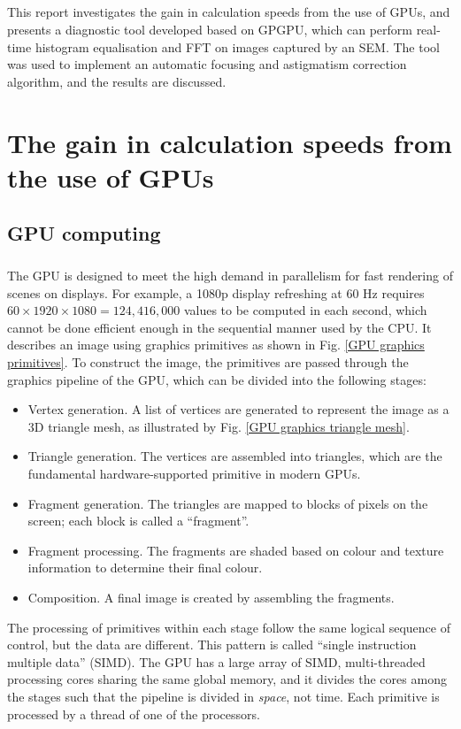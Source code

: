 \documentclass[12pt, twocolumn]{report}
\begin{document}
\paragraph{}
This report investigates the gain in calculation speeds from the use of GPUs, and presents a diagnostic tool developed based on GPGPU, which can perform real-time histogram equalisation and FFT on images captured by an SEM. The tool was used to implement an automatic focusing and astigmatism correction algorithm, and the results are discussed.

\chapter{The gain in calculation speeds from the use of GPUs}
\section{GPU computing}
\paragraph{}
The GPU is designed to meet the high demand in parallelism for fast rendering of scenes on displays. For example, a 1080p display refreshing at 60 Hz requires $60 \times 1920 \times 1080 = 124,416,000$ values to be computed in each second, which cannot be done efficient enough in the sequential manner used by the CPU. It describes an image using graphics primitives as shown in Fig. \ref{GPU graphics primitives}. To construct the image, the primitives are passed through the graphics pipeline of the GPU, which can be divided into the following stages:
\begin{itemize}
    \item Vertex generation. A list of vertices are generated to represent the image as a 3D triangle mesh, as illustrated by Fig. \ref{GPU graphics triangle mesh}.
    \item Triangle generation. The vertices are assembled into triangles, which are the fundamental hardware-supported primitive in modern GPUs.
    \item Fragment generation. The triangles are mapped to blocks of pixels on the screen; each block is called a ``fragment''.
    \item Fragment processing. The fragments are shaded based on colour and texture information to determine their final colour.
    \item Composition. A final image is created by assembling the fragments.
\end{itemize}
The processing of primitives within each stage follow the same logical sequence of control, but the data are different. This pattern is called ``single instruction multiple data'' (SIMD). The GPU has a large array of SIMD, multi-threaded processing cores sharing the same global memory, and it divides the cores among the stages such that the pipeline is divided in \textit{space}, not time. Each primitive is processed by a thread of one of the processors.
\end{document}
